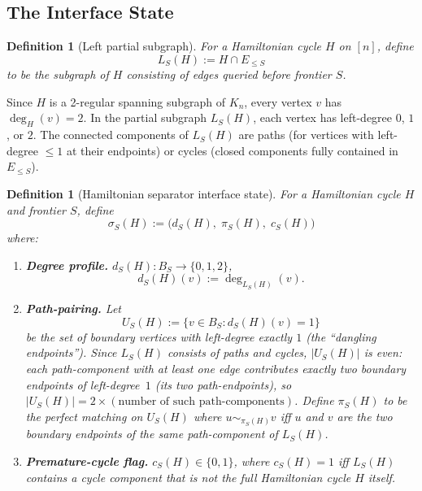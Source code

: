 \documentclass[11pt]{article}
\newtheorem{definition}[theorem]{Definition}
\begin{document}
\subsection{The Interface State}

\begin{definition}[Left partial subgraph]
For a Hamiltonian cycle $H$ on $[n]$, define
\[
  L_S(H) := H \cap E_{\le S}
\]
to be the subgraph of $H$ consisting of edges queried
before frontier $S$.
\end{definition}

Since $H$ is a 2-regular spanning subgraph of $K_n$,
every vertex $v$ has $\deg_H(v) = 2$.
In the partial subgraph $L_S(H)$, each vertex has
left-degree $0$, $1$, or $2$.  The connected components
of $L_S(H)$ are paths (for vertices with left-degree
$\le 1$ at their endpoints) or cycles (closed components
fully contained in $E_{\le S}$).

\begin{definition}[Hamiltonian separator interface state]
\label{def:interface-state}
For a Hamiltonian cycle $H$ and frontier $S$, define
\[
  \sigma_S(H) := \bigl(d_S(H),\; \pi_S(H),\; c_S(H)\bigr)
\]
where:
\begin{enumerate}
\item \textbf{Degree profile.}
  $d_S(H) : B_S \to \{0,1,2\}$,
  \[
    d_S(H)(v) := \deg_{L_S(H)}(v).
  \]
\item \textbf{Path-pairing.}
  Let
  \[
    U_S(H) := \{v \in B_S : d_S(H)(v) = 1\}
  \]
  be the set of boundary vertices with left-degree exactly
  $1$ (the ``dangling endpoints'').
  Since $L_S(H)$ consists of paths and cycles,
  $|U_S(H)|$ is even: each path-component with at least
  one edge contributes exactly two boundary endpoints of
  left-degree~$1$ (its two path-endpoints), so
  $|U_S(H)| = 2 \times (\text{number of such path-components})$.
  Define $\pi_S(H)$ to be the perfect matching on $U_S(H)$
  where $u \sim_{\pi_S(H)} v$ iff $u$ and $v$ are the two
  boundary endpoints of the same path-component of $L_S(H)$.
\item \textbf{Premature-cycle flag.}
  $c_S(H) \in \{0,1\}$, where $c_S(H) = 1$ iff $L_S(H)$
  contains a cycle component that is not the full
  Hamiltonian cycle $H$ itself.
\end{enumerate}
\end{definition}
\end{document}
